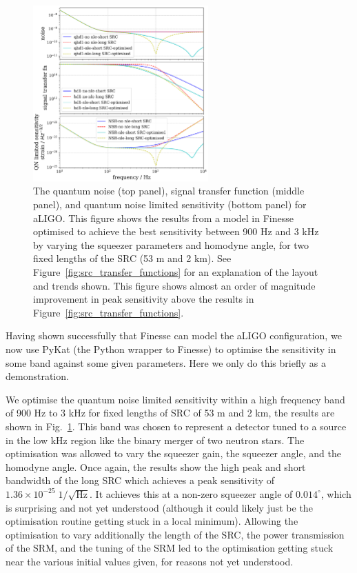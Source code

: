 \documentclass[aps,pra,superscriptaddress,reprint,nofootinbib]{revtex4-1}
\begin{document}
\begin{figure}[ht]
	\begin{center}
	\includegraphics[width=0.6\textwidth]{figures/aLIGO_optimum_sensitivity_comparison.pdf}
	\end{center}
	\caption{The quantum noise (top panel), signal transfer function (middle panel), and quantum noise limited sensitivity (bottom panel) for aLIGO. This figure shows the results from a model in Finesse optimised to achieve the best sensitivity between 900 Hz and 3 kHz by varying the squeezer parameters and homodyne angle, for two fixed lengths of the SRC (53 m and 2 km).
	See Figure~\ref{fig:src_transfer_functions} for an explanation of the layout and trends shown. This figure shows almost an order of magnitude improvement in peak sensitivity above the results in Figure~\ref{fig:src_transfer_functions}.}
	\label{fig:aLIGO_optimum_sensitivity_comparison}
\end{figure}

Having shown successfully that Finesse can model the aLIGO configuration, we now use PyKat (the Python wrapper to Finesse) to optimise the sensitivity in some band against some given parameters. Here we only do this briefly as a demonstration.


We optimise the quantum noise limited sensitivity within a high frequency band of 900 Hz to 3 kHz for fixed lengths of SRC of 53 m and 2 km, the results are shown in Fig.~\ref{fig:aLIGO_optimum_sensitivity_comparison}. This band was chosen to represent a detector tuned to a source in the low kHz region like the binary merger of two neutron stars. The optimisation was allowed to vary the squeezer gain, the squeezer angle, and the homodyne angle. Once again, the results show the high peak and short bandwidth of the long SRC which achieves a peak sensitivity of $1.36 \times 10^{-25}\; 1/\sqrt{\mathrm{Hz}}$. It achieves this at a non-zero squeezer angle of $0.014^\circ$, which is surprising and not yet understood (although it could likely just be the optimisation routine getting stuck in a local minimum). Allowing the optimisation to vary additionally the length of the SRC, the power transmission of the SRM, and the tuning of the SRM led to the optimisation getting stuck near the various initial values given, for reasons not yet understood.
\end{document}
